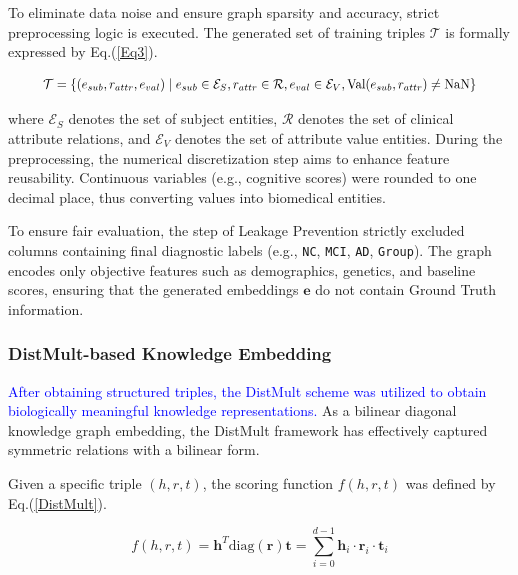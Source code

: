 \documentclass[lettersize,journal]{IEEEtran}
\begin{document}
    To eliminate data noise and ensure graph sparsity and accuracy, strict preprocessing logic is executed. The generated set of training triples $\mathcal{T}$ is formally expressed by Eq.(\ref{Eq3}).
    
    \begin{equation}
        \resizebox{0.9\linewidth}{!}{$
        \mathcal{T} = \{ (e_{sub}, r_{attr}, e_{val}) \mid e_{sub} \in \mathcal{E}_{S}, r_{attr} \in \mathcal{R}, e_{val} \in \mathcal{E}_{V}, \text{Val}(e_{sub}, r_{attr}) \neq \text{NaN} \} $}
        \label{Eq3}
    \end{equation}

    where $\mathcal{E}_{S}$ denotes the set of subject entities, $\mathcal{R}$ denotes the set of clinical attribute relations, and $\mathcal{E}_{V}$ denotes the set of attribute value entities. During the preprocessing, the numerical discretization step aims to enhance feature reusability. Continuous variables (e.g., cognitive scores) were rounded to one decimal place, thus converting values into biomedical entities.


    To ensure fair evaluation, the step of Leakage Prevention strictly excluded columns containing final diagnostic labels (e.g., \texttt{NC}, \texttt{MCI}, \texttt{AD}, \texttt{Group}). The graph encodes only objective features such as demographics, genetics, and baseline scores, ensuring that the generated embeddings $\mathbf{e}$ do not contain Ground Truth information.


\subsubsection{DistMult-based Knowledge Embedding}

    \textcolor{blue}{After obtaining structured triples, the DistMult scheme was utilized to obtain biologically meaningful knowledge representations.} 
    As a bilinear diagonal knowledge graph embedding, the DistMult framework has effectively captured symmetric relations with a bilinear form.

    Given a specific triple $(h, r, t)$, the scoring function $f(h, r, t)$ was defined by Eq.(\ref{DistMult}).
    
    \begin{equation}
        f(h, r, t) = \mathbf{h}^T \text{diag}(\mathbf{r}) \mathbf{t} = \sum_{i=0}^{d-1} \mathbf{h}_i \cdot \mathbf{r}_i \cdot \mathbf{t}_i
        \label{DistMult}
    \end{equation}
\end{document}
